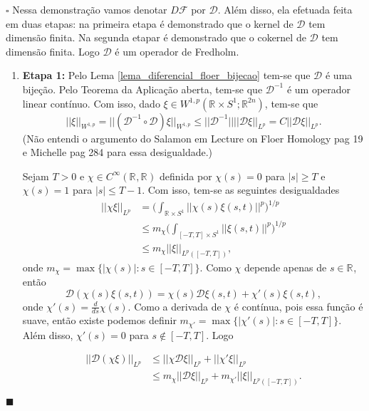 \documentclass[12pt]{book}
\newenvironment{prova}[1]{$\square$ #1}{\hfill$\blacksquare$}
\newcommand{\circulo}{S^{1}}
\newcommand{\diferencialfloer}{D\operadorFloer}
\newcommand{\diferencialfloerabrev}{\mathcal{D}}
\newcommand{\derivada}[2]{\frac{d #1}{d #2}}
\newcommand{\espacosobolevcontradominio}[2]{W^{1,p}(#1;#2)}
\newcommand{\funcoessuaves}[1]{C^{\infty}(#1, \real{})}
\newcommand{\intervalofechado}[1]{[-#1,#1]}
\newcommand{\operadorFloer}{\mathcal{F}}
\newcommand{\norma}[1]{||#1||}
\newcommand{\normaLp}[1]{||#1||_{L^{p}}}
\newcommand{\normaLpdefinicao}[2]{ \Big(\int_{#2}#1^{p}\Big)^{1/p}}
\newcommand{\normaLpDominio}[2]{||#1||_{L^{p}(#2)}}
\newcommand{\normaWp}[1]{||#1||_{W^{1,p}}}
\newcommand{\retacartesianocirculo}{\real{} \times \circulo}
\newcommand{\real}[1]{\mathbb{R}^{#1}}
\newcommand{\reta}{\real{}}
\newcommand{\alerta}[1]{{\color{red}#1}}
\begin{document}
	\begin{prova}
		Nessa demonstração vamos denotar $\diferencialfloer$ por $\diferencialfloerabrev$. Além disso, ela efetuada feita em duas etapas: na primeira etapa é demonstrado que o kernel de $\diferencialfloerabrev$ tem dimensão finita. Na segunda etapar é demonstrado que o cokernel de $\diferencialfloerabrev$ tem dimensão finita. Logo $\diferencialfloerabrev$ é um operador de Fredholm.
		
		\begin{enumerate}
			\item \textbf{Etapa 1:}
			Pelo Lema \ref{lema_diferencial_floer_bijecao} tem-se que $\diferencialfloerabrev$ é uma bijeção. Pelo Teorema da Aplicação aberta, tem-se que $\diferencialfloerabrev^{-1}$ é um operador linear contínuo. Com isso, dado $\xi \in \espacosobolevcontradominio{\retacartesianocirculo}{\real{2n}}$, tem-se que
			$$
			\normaWp{\xi} = \normaWp{(\diferencialfloerabrev^{-1}\circ\diferencialfloerabrev )\xi} \leq \norma{\diferencialfloerabrev^{-1}}\normaLp{\diferencialfloerabrev\xi}= C\normaLp{\diferencialfloerabrev\xi}.
			$$
			\alerta{(Não entendi o argumento do Salamon em Lecture on Floer Homology pag 19 e Michelle pag 284 para essa desigualdade.)}
			
			Sejam $T>0$ e $\chi \in \funcoessuaves{\reta}$ definida por $\chi(s)=0$ para $|s|\geq T$ e $\chi(s)=1$ para $|s|\leq T-1$. Com isso, tem-se as seguintes desigualdades
			$$
			\begin{aligned}
			\normaLp{\chi\xi} 
			&=\normaLpdefinicao{\norma{\chi(s)\xi(s,t)}}{\retacartesianocirculo}
			\\
			&\leq m_{\chi} \normaLpdefinicao{\norma{\xi(s,t)}}{\intervalofechado{T}\times \circulo} 
			\\
			&\leq m_{\chi} \normaLpDominio{\xi}{\intervalofechado{T}},
			\end{aligned}
			$$	
			onde $ m_{\chi} = \max\{|\chi(s)|: s\in \intervalofechado{T} \}$. Como $\chi$ depende apenas de $s\in \reta$, então
			$$
			\diferencialfloerabrev(\chi(s)\xi(s,t)) = \chi(s)\diferencialfloerabrev\xi(s,t) +  \chi'(s)\xi(s,t),
			$$
			onde $\chi'(s)=\derivada{}{s}\chi(s)$. Como a derivada de $\chi$ é contínua, pois essa função é suave, então existe podemos definir $m_{\chi'} = \max\{|\chi'(s)|: s\in \intervalofechado{T} \}$. Além disso, $\chi'(s)=0$ para $s \notin 
			\intervalofechado{T}$. Logo
			
			$$
			\begin{aligned}
			\normaLp{\diferencialfloerabrev(\chi\xi)} 
			&\leq \normaLp{\chi\diferencialfloerabrev \xi} +\normaLp{\chi'\xi} 
			\\
			&\leq m_{\chi}\normaLp{\diferencialfloerabrev \xi} +	m_{\chi'}\normaLpDominio{\xi}{\intervalofechado{T}}.
			\end{aligned}
			$$	
			

\end{enumerate}
\end{prova}
\end{document}
